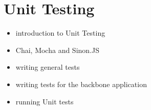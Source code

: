 \documentclass{article}
\begin{document}
\section{Unit Testing}
	\begin{itemize}
		\item introduction to Unit Testing
		\item Chai, Mocha and Sinon.JS
		\item writing general tests
		\item writing tests for the backbone application
		\item running Unit tests
	\end{itemize}
\end{document}
